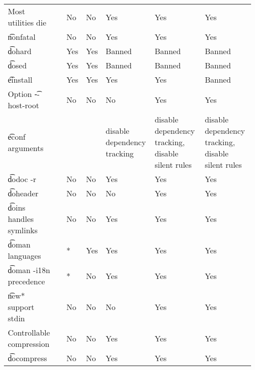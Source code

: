 \begin{landscape}
\begin{longtable}{llP{7.5em}P{7.5em}P{7.5em}P{7.5em}P{7.5em}}
Most utilities die &  &
    No & No & Yes & Yes & Yes \\

\t{nonfatal} &  &
    No & No & Yes & Yes & Yes \\

\t{dohard} &  &
    Yes & Yes & Banned & Banned & Banned \\

\t{dosed} &  &
    Yes & Yes & Banned & Banned & Banned \\

\t{einstall} &  &
    Yes & Yes & Yes & Yes & Banned \\

Option \t{-{}-host-root} &  &
    No & No & No & Yes & Yes \\

\t{econf} arguments &  &
    &  & disable dependency tracking &
    disable dependency tracking, disable silent rules &
    disable dependency tracking, disable silent rules \\

\t{dodoc -r} &  &
    No & No & Yes & Yes & Yes \\

\t{doheader} &  &
    No & No & No & Yes & Yes \\

\t{doins} handles symlinks &  &
    No & No & Yes & Yes & Yes \\

\t{doman} languages &  &
    * & Yes & Yes & Yes & Yes \\

\t{doman -i18n} precedence &  &
    * & No & Yes & Yes & Yes \\

\t{new*} support stdin &  &
    No & No & No & Yes & Yes \\

Controllable compression &  &
    No & No & Yes & Yes & Yes \\

\t{docompress} &  &
    No & No & Yes & Yes & Yes \\


\end{longtable}
\end{landscape}

